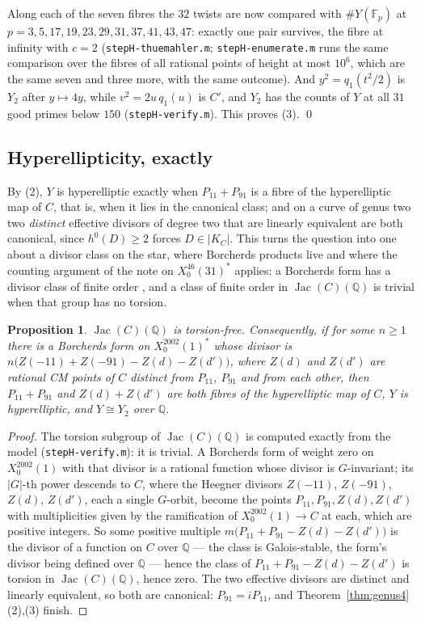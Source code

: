 \documentclass[11pt,reqno]{amsart}
\theoremstyle{plain}
\newtheorem{proposition}[theorem]{Proposition}
\theoremstyle{definition}
\DeclareMathOperator{\Jac}{Jac}
\newcommand{\Q}{\mathbb{Q}}
\newcommand{\F}{\mathbb{F}}
\begin{document}
Along each of the seven fibres the $32$ twists are now compared with $\#Y(\F_p)$ at $p=3,5,17,19,
23,29,31,37,41,43,47$: exactly one pair survives, the fibre at infinity with $c=2$
(\texttt{stepH-thuemahler.m}; \texttt{stepH-enumerate.m} runs the same comparison over the fibres
of all rational points of height at most $10^6$, which are the same seven and three more, with the
same outcome). And $y^2=q_1(t^2/2)$ is $Y_2$ after $y\mapsto4y$, while $v^2=2u\,q_1(u)$ is $C'$,
and $Y_2$ has the counts of $Y$ at all $31$ good primes below $150$ (\texttt{stepH-verify.m}). This
proves (3). \qed

\subsection*{Hyperellipticity, exactly}
By (2), $Y$ is hyperelliptic exactly when $P_{11}+P_{91}$ is a fibre of the hyperelliptic map of
$C$, that is, when it lies in the canonical class; and on a curve of genus two two \emph{distinct}
effective divisors of degree two that are linearly equivalent are both canonical, since
$h^0(D)\ge2$ forces $D\in|K_C|$. This turns the question into one about a divisor class on the
star, where Borcherds products live and where the counting argument of the note on $X_0^{46}(31)^*$
applies: a Borcherds form has a divisor class of finite order \cite{borcherds}, and a class of
finite order in $\Jac(C)(\Q)$ is trivial when that group has no torsion.

\begin{proposition}\label{prop:count}
$\Jac(C)(\Q)$ is torsion-free. Consequently, if for some $n\ge1$ there is a Borcherds form on
$X_0^{2002}(1)^*$ whose divisor is $n\bigl(Z(-11)+Z(-91)-Z(d)-Z(d')\bigr)$, where $Z(d)$ and
$Z(d')$ are rational CM points of $C$ distinct from $P_{11}$, $P_{91}$ and from each other, then
$P_{11}+P_{91}$ and $Z(d)+Z(d')$ are both fibres of the hyperelliptic map of $C$, $Y$ is
hyperelliptic, and $Y\cong Y_2$ over $\Q$.
\end{proposition}

\begin{proof}
The torsion subgroup of $\Jac(C)(\Q)$ is computed exactly from the model (\texttt{stepH-verify.m}):
it is trivial. A Borcherds form of weight zero on $X_0^{2002}(1)$ with that divisor is a rational
function whose divisor is $G$-invariant; its $|G|$-th power descends to $C$, where the Heegner
divisors $Z(-11)$, $Z(-91)$, $Z(d)$, $Z(d')$, each a single $G$-orbit, become the points
$P_{11},P_{91},Z(d),Z(d')$ with multiplicities given by the ramification of $X_0^{2002}(1)\to C$ at
each, which are positive integers. So some positive multiple $m\bigl(P_{11}+P_{91}-Z(d)-Z(d')\bigr)$
is the divisor of a function on $C$ over $\Q$ --- the class is Galois-stable, the form's divisor
being defined over $\Q$ --- hence the class of $P_{11}+P_{91}-Z(d)-Z(d')$ is torsion in
$\Jac(C)(\Q)$, hence zero. The two effective divisors are distinct and linearly equivalent, so both
are canonical: $P_{91}=\bar\iota P_{11}$, and Theorem~\ref{thm:genus4}(2),(3) finish.
\end{proof}
\end{document}
